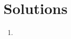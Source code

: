 \documentclass[../../linear_algebra.tex]{subfiles}
\begin{document}
\section{Solutions}
\begin{enumerate}
    \item 
\end{enumerate}
\end{document}
